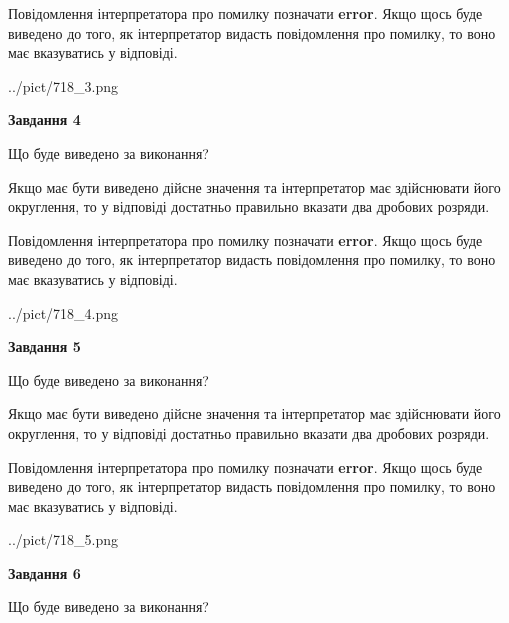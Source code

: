 \documentclass[12pt, ukrainian]{article}
\begin{document}
{\begin {Large}
Повідомлення інтерпретатора про помилку позначати \textbf{error}.
Якщо щось буде виведено до того, як інтерпретатор видасть повідомлення про помилку, 
то воно має вказуватись у відповіді. \par

\begin{center}
	{../pict/718_3.png}
\end{center}
\newpage

{\begin {center}\textbf{Завдання 4}\end {center}}\par
Що буде виведено за виконання? \par

Якщо має бути виведено дійсне значення та інтерпретатор має здійснювати його округлення, 
то у відповіді достатньо правильно вказати два дробових розряди.

Повідомлення інтерпретатора про помилку позначати \textbf{error}.
Якщо щось буде виведено до того, як інтерпретатор видасть повідомлення про помилку, 
то воно має вказуватись у відповіді. \par

\begin{center}
	{../pict/718_4.png}
\end{center}
\newpage

{\begin {center}\textbf{Завдання 5}\end {center}}\par
Що буде виведено за виконання? \par

Якщо має бути виведено дійсне значення та інтерпретатор має здійснювати його округлення, 
то у відповіді достатньо правильно вказати два дробових розряди.

Повідомлення інтерпретатора про помилку позначати \textbf{error}.
Якщо щось буде виведено до того, як інтерпретатор видасть повідомлення про помилку, 
то воно має вказуватись у відповіді. \par

\begin{center}
	{../pict/718_5.png}
\end{center}
\newpage

{\begin {center}\textbf{Завдання 6}\end {center}}\par
Що буде виведено за виконання? \par


\end{Large}}
\end{document}
